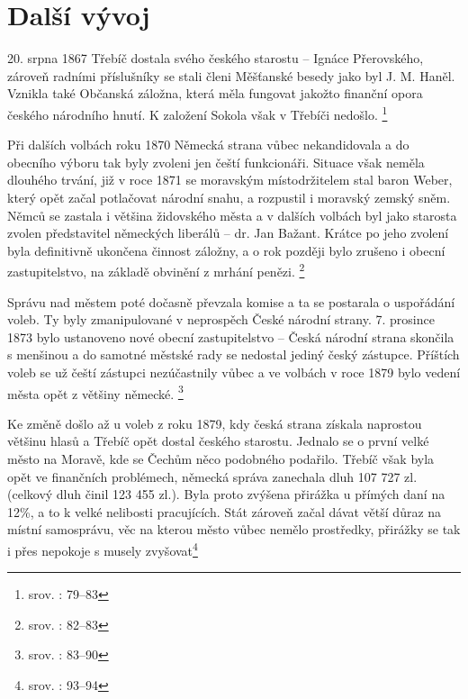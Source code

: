 \documentclass[a4paper,oneside,12p]{report}
\begin{document}
\section{Další vývoj}

20. srpna 1867 Třebíč dostala svého českého starostu -- Ignáce Přerovského, zároveň radními příslušníky se stali členi Měšťanské besedy jako byl J. M. Haněl.
Vznikla také Občanská záložna, která měla fungovat jakožto finanční opora českého národního hnutí.
K založení Sokola však v Třebíči nedošlo. \footnote{srov. \cite{Janak1981}: 79--83}

Při dalších volbách roku 1870 Německá strana vůbec nekandidovala a do obecního výboru tak byly zvoleni jen čeští funkcionáři.
Situace však neměla dlouhého trvání, již v roce 1871 se moravským místodržitelem stal baron Weber, který opět začal potlačovat národní snahu, a rozpustil i moravský zemský sněm.
Němců se zastala i většina židovského města a v dalších volbách byl jako starosta zvolen představitel německých liberálů -- dr. Jan Bažant.
Krátce po jeho zvolení byla definitivně ukončena činnost záložny, a o rok později bylo zrušeno i obecní zastupitelstvo, na základě obvinění z mrhání penězi. \footnote{srov. \cite{Janak1981}: 82--83}

Správu nad městem poté dočasně převzala komise a ta se postarala o uspořádání voleb.
Ty byly zmanipulované v neprospěch České národní strany.
7. prosince 1873 bylo ustanoveno nové obecní zastupitelstvo -- Česká národní strana skončila s menšinou a do samotné městské rady se nedostal jediný český zástupce.
Příštích voleb se už čeští zástupci nezúčastnily vůbec a ve volbách v roce 1879 bylo vedení města opět z většiny německé. \footnote{srov. \cite{Janak1981}: 83--90}


Ke změně došlo až u voleb z roku 1879, kdy česká strana získala naprostou většinu hlasů a Třebíč opět dostal českého starostu.
Jednalo se o první velké město na Moravě, kde se Čechům něco podobného podařilo.
Třebíč však byla opět ve finančních problémech, německá správa zanechala dluh 107 727 zl. (celkový dluh činil 123 455 zl.).
Byla proto zvýšena přirážka u přímých daní na 12\%, a to k velké nelibosti pracujících.
Stát zároveň začal dávat větší důraz na místní samosprávu, věc na kterou město vůbec nemělo prostředky, přirážky se tak i přes nepokoje s musely zvyšovat\footnote{srov. \cite{Janak1981}: 93--94}
\end{document}
